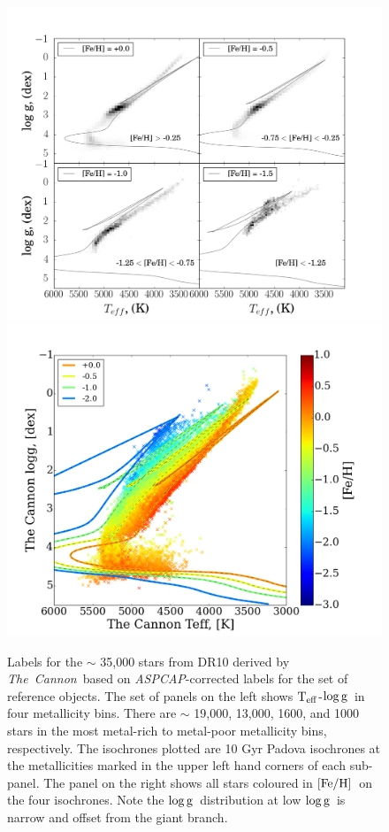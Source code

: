 \documentclass[12pt, preprint]{aastex}
\newcommand{\tc}{\textsl{The~Cannon}}
\newcommand{\aspcap}{\textsl{ASPCAP}}
\newcommand{\teff}{\mbox{$\rm T_{eff}$}}
\newcommand{\feh}{\mbox{$\rm [Fe/H]$}}
\newcommand{\logg}{\mbox{$\rm \log g$}}
\begin{document}
\begin{figure}[!h]
\centering
  \includegraphics[scale=0.25]{./plots/iso1_2.png}
  \hspace{-20pt}
    \includegraphics[scale=0.25]{./plots/iso1a_2.png}
\caption{Labels for the $\sim$ 35,000 stars from DR10 derived by \tc\ based on \aspcap-corrected labels for the set of reference objects. The set of panels on the left shows \teff-\logg\ in four metallicity bins. There are $\sim$ 19,000, 13,000, 1600, and 1000 stars in the most metal-rich to metal-poor metallicity bins, respectively. The isochrones plotted are 10 Gyr Padova isochrones at the metallicities marked in the upper left hand corners of each sub-panel.  The panel on the right shows all stars coloured in \feh\ on the four isochrones. Note the \logg\ distribution at low \logg\ is narrow and offset from the giant branch. }
\label{fig:iso}
\end{figure}
\end{document}
